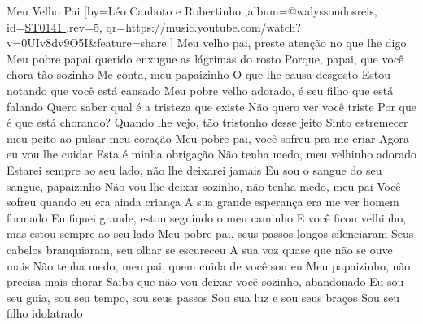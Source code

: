 \beginsong
{Meu Velho Pai %
}[by={Léo Canhoto e Robertinho %
},album={@walyssondosreis},
id={\href{https://music.youtube.com/watch?v=0UIv8dv9O5I&feature=share %
}{ST0141 %
}},rev={5}, %
qr={https://music.youtube.com/watch?v=0UIv8dv9O5I&feature=share %
}]
\beginverse
 Meu velho pai, preste atenção no que lhe digo
Meu pobre papai querido enxugue as lágrimas do rosto
Porque, papai, que você chora tão sozinho
Me conta, meu papaizinho
O que lhe causa desgosto
\endverse
\beginverse
 Estou notando que você está cansado
Meu pobre velho adorado, é seu filho que está falando
Quero saber qual é a tristeza que existe
Não quero ver você triste
Por que é que está chorando?
\endverse
{}
\beginverse
 Quando lhe vejo, tão tristonho desse jeito
Sinto estremecer meu peito ao pulsar meu coração
Meu pobre pai, você sofreu pra me criar
Agora eu vou lhe cuidar
Esta é minha obrigação
\endverse
\beginverse
 Não tenha medo, meu velhinho adorado
Estarei sempre ao seu lado, não lhe deixarei jamais
Eu sou o sangue do seu sangue, papaizinho
Não vou lhe deixar sozinho, não tenha medo, meu pai
\endverse
{}
\beginverse
 Você sofreu quando eu era ainda criança
A sua grande esperança era me ver homem formado
Eu fiquei grande, estou seguindo o meu caminho
E você ficou velhinho, mas estou sempre ao seu lado
\endverse
\beginverse
 Meu pobre pai, seus passos longos silenciaram
Seus cabelos branquiaram, seu olhar se escureceu
A sua voz quase que não se ouve mais
Não tenha medo, meu pai, quem cuida de você sou eu
\endverse
\beginchorus
 Meu papaizinho, não precisa mais chorar
Saiba que não vou deixar você sozinho, abandonado 
Eu sou seu guia, sou seu tempo, sou seus passos
Sou sua luz e sou seus braços
Sou seu filho idolatrado
\endchorus
{}

